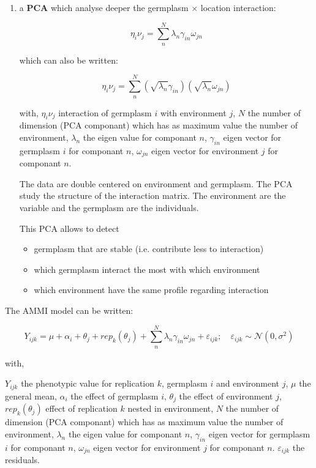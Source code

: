 \documentclass{article}\usepackage[]{graphicx}\usepackage[]{color}
\begin{document}
\begin{enumerate}
\item a \textbf{PCA} which analyse deeper the germplasm $\times$ location interaction: 

\begin{displaymath}
\eta_{i}\nu_{j} = \sum_{n}^{N} \lambda_{n} \gamma_{in} \omega_{jn}
\end{displaymath}

which can also be written:

\begin{displaymath}
\eta_{i}\nu_{j} = \sum_{n}^{N} (\sqrt{\lambda_{n}} \gamma_{in}) (\sqrt{\lambda_{n}} \omega_{jn})
\end{displaymath}

with,
$\eta_{i}\nu_{j}$ interaction of germplasm $i$ with environment $j$,
$N$ the number of dimension (PCA componant) which has as maximum value the number of environment,
$\lambda_{n}$ the eigen value for componant $n$,
$\gamma_{in}$ eigen vector for germplasm $i$ for componant $n$,
$\omega_{jn}$ eigen vector for  environment $j$  for componant $n$.

The data are double centered on environment and germplasm.
The PCA study the structure of the interaction matrix.
The environment are the variable and the germplasm are the individuals.

This PCA allows to detect
\begin{itemize}
\item germplasm that are stable (i.e. contribute less to interaction)
\item which germplasm interact the most with which environment
\item which environment have the same profile regarding interaction
\end{itemize}

\end{enumerate}


The AMMI model can be written:

\begin{equation}
Y_{ijk} = \mu + \alpha_{i} + \theta_{j} + rep_{k}(\theta_{j}) + \sum_{n}^{N} \lambda_{n} \gamma_{in} \omega_{jn} + \varepsilon_{ijk}; \quad \varepsilon_{ijk} \sim \mathcal{N} (0,\sigma^2)
\label{modele_ammi}
\end{equation}

with,

$Y_{ijk}$ the phenotypic value for replication $k$, germplasm $i$ and environment $j$,
$\mu$ the general mean,
$\alpha_{i}$ the effect of germplasm $i$,
$\theta_{j}$ the effect of environment $j$,
$rep_{k}(\theta_{j})$ effect of replication $k$ nested in environment,
$N$ the number of dimension (PCA componant) which has as maximum value the number of environment,
$\lambda_{n}$ the eigen value for componant $n$,
$\gamma_{in}$ eigen vector for germplasm $i$ for componant $n$,
$\omega_{jn}$ eigen vector for  environment $j$  for componant $n$.
$\varepsilon_{ijk}$ the residuals.\\
\end{document}

